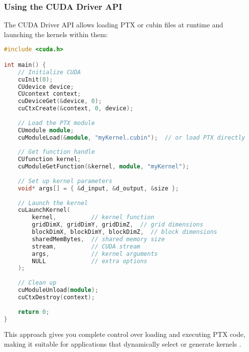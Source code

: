 \subsubsection{Using the CUDA Driver API}

The CUDA Driver API allows loading PTX or cubin files at runtime and launching the kernels within them:

\begin{lstlisting}[language=C++]
#include <cuda.h>

int main() {
    // Initialize CUDA
    cuInit(0);
    CUdevice device;
    CUcontext context;
    cuDeviceGet(&device, 0);
    cuCtxCreate(&context, 0, device);
    
    // Load the PTX module
    CUmodule module;
    cuModuleLoad(&module, "myKernel.cubin");  // or load PTX directly
    
    // Get function handle
    CUfunction kernel;
    cuModuleGetFunction(&kernel, module, "myKernel");
    
    // Set up kernel parameters
    void* args[] = { &d_input, &d_output, &size };
    
    // Launch the kernel
    cuLaunchKernel(
        kernel,          // kernel function
        gridDimX, gridDimY, gridDimZ,  // grid dimensions
        blockDimX, blockDimY, blockDimZ,  // block dimensions
        sharedMemBytes,  // shared memory size
        stream,          // CUDA stream
        args,            // kernel arguments
        NULL             // extra options
    );
    
    // Clean up
    cuModuleUnload(module);
    cuCtxDestroy(context);
    
    return 0;
}
\end{lstlisting}

This approach gives you complete control over loading and executing PTX code, making it suitable for applications that dynamically select or generate kernels \citep{llvm_nvptx_guide}.

